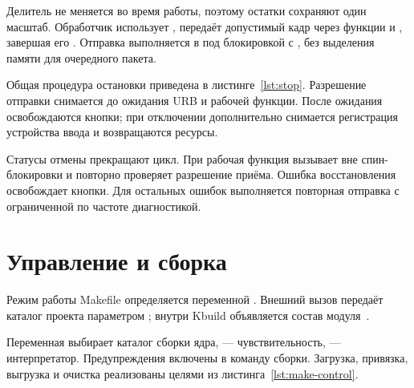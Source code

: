 Делитель не меняется во время работы, поэтому остатки сохраняют один масштаб. Обработчик  использует , передаёт допустимый кадр через функции  и , завершая его . Отправка выполняется в  под блокировкой с , без выделения памяти для очередного пакета.

Общая процедура остановки приведена в листинге~\ref{lst:stop}. Разрешение отправки снимается до ожидания URB и рабочей функции. После ожидания освобождаются кнопки; при отключении дополнительно снимается регистрация устройства ввода и возвращаются ресурсы.

\par\noindent\begin{minipage}{\linewidth}

\end{minipage}\par

Статусы отмены прекращают цикл. При  рабочая функция вызывает  вне спин-блокировки и повторно проверяет разрешение приёма. Ошибка восстановления освобождает кнопки. Для остальных ошибок выполняется повторная отправка с ограниченной по частоте диагностикой.

\section{Управление и сборка}

Режим работы Makefile определяется переменной . Внешний вызов передаёт каталог проекта параметром ; внутри Kbuild объявляется состав модуля~\cite{kbuild}.

\par\noindent\begin{minipage}{\linewidth}

\end{minipage}\par

Переменная  выбирает каталог сборки ядра,  --- чувствительность,  --- интерпретатор. Предупреждения  включены в команду сборки. Загрузка, привязка, выгрузка и очистка реализованы целями из листинга~\ref{lst:make-control}.


